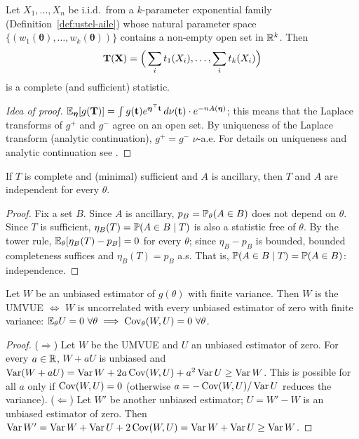 \documentclass[main.tex]{subfiles}
\begin{document}
\begin{theorem}\label{thm:ustel-tam}
Let $X_1,\dots,X_n$ be i.i.d.\ from a $k$-parameter exponential family (Definition~\ref{def:ustel-aile}) whose natural parameter space $\{(w_1(\bm\theta),\dots,w_k(\bm\theta))\}$ contains a non-empty open set in $\R^k$. Then
\[
\mathbf T(\X)=\Big(\sum_i t_1(X_i),\dots,\sum_i t_k(X_i)\Big)
\]
is a complete (and sufficient) statistic.
\end{theorem}
\begin{proof}[Idea of proof]
$\E_{\bm\eta}[g(\mathbf T)]=\int g(\mathbf t)e^{\bm\eta^\top\mathbf t}\,d\nu(\mathbf t)\cdot e^{-nA(\bm\eta)}$; this means that the Laplace transforms of $g^+$ and $g^-$ agree on an open set. By uniqueness of the Laplace transform (analytic continuation), $g^+=g^-$ $\nu$-a.e. For details on uniqueness and analytic continuation see \cite[Theorem~2.7.1 and Section~4.3]{lehmann-romano}.
\end{proof}

\begin{theorem}\label{thm:basu}
If $T$ is complete and (minimal) sufficient and $A$ is ancillary, then $T$ and $A$ are independent for every $\theta$.
\end{theorem}
\begin{proof}
Fix a set $B$. Since $A$ is ancillary, $p_B=\P_\theta(A\in B)$ does not depend on $\theta$. Since $T$ is sufficient, $\eta_B(T)=\P(A\in B\mid T)$ is also a statistic free of $\theta$. By the tower rule, $\E_\theta[\eta_B(T)-p_B]=0$ for every $\theta$; since $\eta_B-p_B$ is bounded, bounded completeness suffices and $\eta_B(T)=p_B$ a.s. That is, $\P(A\in B\mid T)=\P(A\in B)$: independence.
\end{proof}

\begin{theorem}\label{thm:umvue-karakter}
Let $W$ be an unbiased estimator of $g(\theta)$ with finite variance. Then $W$ is the UMVUE $\iff$ $W$ is uncorrelated with every unbiased estimator of zero with finite variance: $\E_\theta U=0\ \forall\theta\implies\Cov_\theta(W,U)=0\ \forall\theta$.
\end{theorem}
\begin{proof}
($\Rightarrow$) Let $W$ be the UMVUE and $U$ an unbiased estimator of zero. For every $a\in\R$, $W+aU$ is unbiased and
$\Var(W+aU)=\Var W+2a\Cov(W,U)+a^2\Var U\ge\Var W$. This is possible for all $a$ only if $\Cov(W,U)=0$ (otherwise $a=-\Cov(W,U)/\Var U$ reduces the variance).
($\Leftarrow$) Let $W'$ be another unbiased estimator; $U=W'-W$ is an unbiased estimator of zero. Then $\Var W'=\Var W+\Var U+2\Cov(W,U)=\Var W+\Var U\ge\Var W$.
\end{proof}
\end{document}
